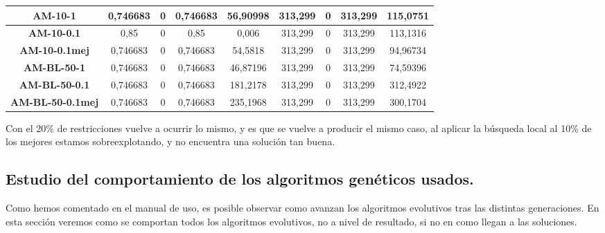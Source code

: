 \documentclass[12pt, spanish]{article}
\begin{document}
\begin{table}[H]
\begin{tabular}{|c|c|c|c|c|c|c|c|c|}
\textbf{AM-10-1}         & 0,746683                  & 0                           & 0,746683               & 56,90998   & 313,299                   & 0                           & 313,299                & 115,0751   \\ \hline
\textbf{AM-10-0.1}       & 0,85                      & 0                           & 0,85                   & 0,006      & 313,299                   & 0                           & 313,299                & 113,1316   \\ \hline
\textbf{AM-10-0.1mej}    & 0,746683                  & 0                           & 0,746683               & 54,5818    & 313,299                   & 0                           & 313,299                & 94,96734   \\ \hline
\textbf{AM-BL-50-1}      & 0,746683                  & 0                           & 0,746683               & 46,87196   & 313,299                   & 0                           & 313,299                & 74,59396   \\ \hline
\textbf{AM-BL-50-0.1}    & 0,746683                  & 0                           & 0,746683               & 181,2178   & 313,299                   & 0                           & 313,299                & 312,4922   \\ \hline
\textbf{AM-BL-50-0.1mej} & 0,746683                  & 0                           & 0,746683               & 235,1968   & 313,299                   & 0                           & 313,299                & 300,1704   \\ \hline
\end{tabular}
\end{table}

Con el 20\% de restricciones vuelve a ocurrir lo mismo, y es que se vuelve a producir el mismo caso, al aplicar la búsqueda local al 10\% de los mejores estamos sobreexplotando, y no encuentra una solución tan buena.

\newpage

\subsection{Estudio del comportamiento de los algoritmos genéticos usados.}


Como hemos comentado en el manual de uso, es posible observar como avanzan los algoritmos evolutivos tras las distintas generaciones. En esta sección veremos como se comportan todos los algoritmos evolutivos, no a nivel de resultado, si no en como llegan a las soluciones.
\end{document}
